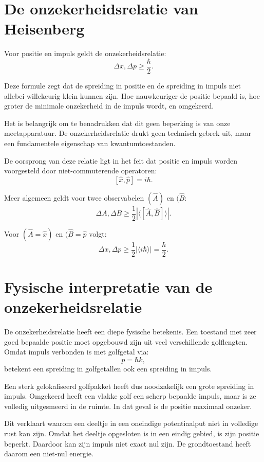 \documentclass{report} %
\begin{document}
    \section{De onzekerheidsrelatie van Heisenberg}

    Voor positie en impuls geldt de onzekerheidsrelatie:
    \[
        \Delta x,\Delta p
        \geq
        \frac{\hbar}{2}.
    \]

    Deze formule zegt dat de spreiding in positie en de spreiding in impuls niet allebei willekeurig klein kunnen zijn. Hoe nauwkeuriger de positie bepaald is, hoe groter de minimale onzekerheid in de impuls wordt, en omgekeerd.

    Het is belangrijk om te benadrukken dat dit geen beperking is van onze meetapparatuur. De onzekerheidsrelatie drukt geen technisch gebrek uit, maar een fundamentele eigenschap van kwantumtoestanden.

    De oorsprong van deze relatie ligt in het feit dat positie en impuls worden voorgesteld door niet-commuterende operatoren:
    \[
        [\hat{x},\hat{p}]=i\hbar.
    \]

    Meer algemeen geldt voor twee observabelen $(\hat{A})$ en $(\hat{B}$:
    \[
        \Delta A,\Delta B
        \geq
        \frac{1}{2}
        \left|
            \langle [\hat{A},\hat{B}]\rangle
        \right|.
    \]

    Voor $(\hat{A}=\hat{x})$ en $(\hat{B}=\hat{p}$ volgt:
    \[
        \Delta x,\Delta p
        \geq
        \frac{1}{2}
        |\langle i\hbar\rangle|
        =
        \frac{\hbar}{2}.
    \]


    \section{Fysische interpretatie van de onzekerheidsrelatie}

    De onzekerheidsrelatie heeft een diepe fysische betekenis. Een toestand met zeer goed bepaalde positie moet opgebouwd zijn uit veel verschillende golflengten. Omdat impuls verbonden is met golfgetal via:
    \[
        p=\hbar k,
    \]
    betekent een spreiding in golfgetallen ook een spreiding in impuls.

    Een sterk gelokaliseerd golfpakket heeft dus noodzakelijk een grote spreiding in impuls. Omgekeerd heeft een vlakke golf een scherp bepaalde impuls, maar is ze volledig uitgesmeerd in de ruimte. In dat geval is de positie maximaal onzeker.

    Dit verklaart waarom een deeltje in een oneindige potentiaalput niet in volledige rust kan zijn. Omdat het deeltje opgesloten is in een eindig gebied, is zijn positie beperkt. Daardoor kan zijn impuls niet exact nul zijn. De grondtoestand heeft daarom een niet-nul energie.
\end{document}
